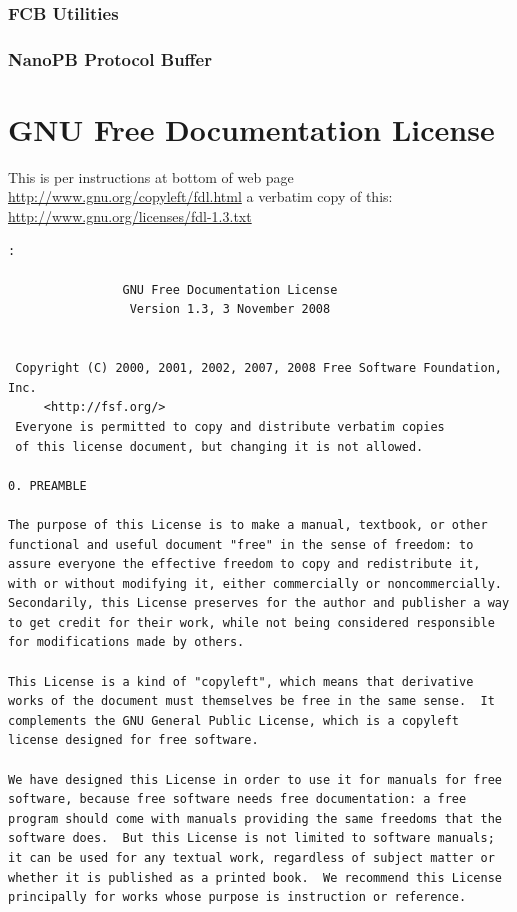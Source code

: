 \documentclass[a4paper]{report}
\begin{document}
		\subsection{FCB Utilities}

		\subsection{NanoPB Protocol Buffer}
\appendix
\chapter{GNU Free Documentation License}
This is per instructions at bottom of web page \url{http://www.gnu.org/copyleft/fdl.html} a verbatim copy of this: \url{http://www.gnu.org/licenses/fdl-1.3.txt}
\begin{verbatim}:

                GNU Free Documentation License
                 Version 1.3, 3 November 2008


 Copyright (C) 2000, 2001, 2002, 2007, 2008 Free Software Foundation, Inc.
     <http://fsf.org/>
 Everyone is permitted to copy and distribute verbatim copies
 of this license document, but changing it is not allowed.

0. PREAMBLE

The purpose of this License is to make a manual, textbook, or other
functional and useful document "free" in the sense of freedom: to
assure everyone the effective freedom to copy and redistribute it,
with or without modifying it, either commercially or noncommercially.
Secondarily, this License preserves for the author and publisher a way
to get credit for their work, while not being considered responsible
for modifications made by others.

This License is a kind of "copyleft", which means that derivative
works of the document must themselves be free in the same sense.  It
complements the GNU General Public License, which is a copyleft
license designed for free software.

We have designed this License in order to use it for manuals for free
software, because free software needs free documentation: a free
program should come with manuals providing the same freedoms that the
software does.  But this License is not limited to software manuals;
it can be used for any textual work, regardless of subject matter or
whether it is published as a printed book.  We recommend this License
principally for works whose purpose is instruction or reference.



\end{verbatim}
\end{document}

